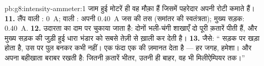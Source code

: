 \begin{solution}{pb:g8:intensity-ammeter:1}
जाम हुई मोटरें ही वह मौक़ा हैं जिसमें पहरेदार अपनी रोटी कमाते हैं।
\textbf{11.} लैंप वाली : \qty{0}{A};  वाली : अपनी
\qty{0.40}{A} जस की तस (समांतर की स्वतंत्रता); मुख्य सड़क:
\qty{0.40}{A}.
\textbf{12.} उदारता का दाम  पर चुकाया जाता है: दोनों भली-चंगी
शाखाएँ दो पूरी क़तारें पीती हैं, और मुख्य सड़क की जुड़ी हुई धारा भंडार
को सबसे तेज़ी से ख़ाली कर देती है।
\textbf{13.} जैसे: `` सड़क पर खड़ा होता है, उस पर पुल बनकर कभी
नहीं। एक फंदा एक  की ज़मानत देता है --- हर जगह, हमेशा। और 
अपना बहीखाता बराबर रखती है: जितनी क़तारें भीतर, उतनी ही बाहर, वह भी
मिलीऐम्पियर तक।''
\end{solution}
